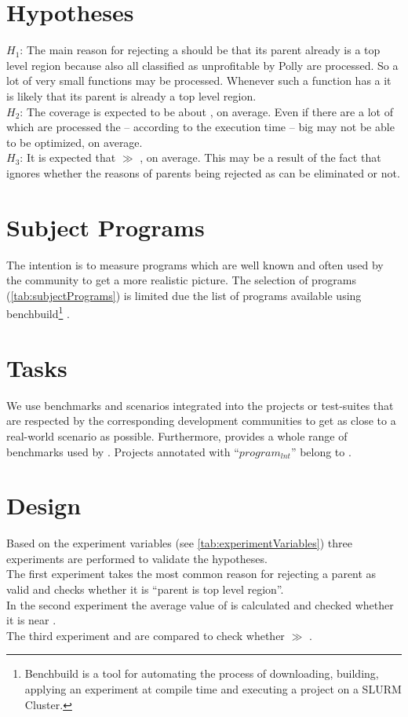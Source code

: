 \section{Hypotheses}
\(H_1\): The main reason for rejecting a \scop should be that its parent already is a top level region because also all \scops classified as unprofitable by Polly are processed.
So a lot of very small functions may be processed.
Whenever such a function has a \scop it is likely that its parent is already a top level region.\\
\(H_2\): The coverage \dyncovs is expected to be about \hTwoAbout, on average.
Even if there are a lot of \scops which are processed the -- according to the execution time -- big \scops may not be able to be optimized, on average.\\
\(H_3\): It is expected that \dyncovp \(\gg\) \dyncovs, on average.
This may be a result of the fact that \dyncovp ignores whether the reasons of parents being rejected as \scop can be eliminated or not.\\

\section{Subject Programs}
The intention is to measure programs which are well known and often used by the community to get a more realistic picture.
The selection of programs (\autoref{tab:subjectPrograms}) is limited due the list of programs available using benchbuild\footnote{Benchbuild is a tool for automating the process of downloading, building, applying an experiment at compile time and executing a project on a SLURM \cite{slurm} Cluster.} \cite{benchbuild}.

\section{Tasks}
\begin{sloppypar}
    We use benchmarks and scenarios integrated into the projects or test-suites that are respected by the corresponding development communities to get as close to a real-world scenario as possible.
    Furthermore, \lnt provides a whole range of benchmarks used by \llvm.
    Projects annotated with \enquote{\(program_{lnt}\)} belong to \lnt.
\end{sloppypar}

\section{Design}
Based on the experiment variables (see \autoref{tab:experimentVariables}) three experiments are performed to validate the hypotheses.\\
The first experiment takes the most common reason for rejecting a parent as valid \scop and checks whether it is \enquote{parent is top level region}.\\
In the second experiment the average value of \dyncovs is calculated and checked whether it is near \hTwoAbout.\\
The third experiment \dyncovp and \dyncovs are compared to check whether \dyncovp \(\gg\) \dyncovs.

